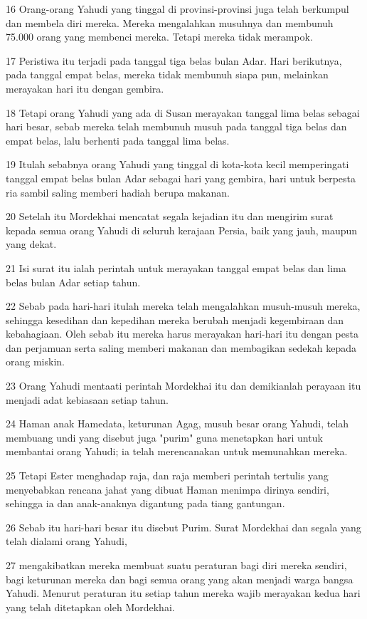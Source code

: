 \par 16 Orang-orang Yahudi yang tinggal di provinsi-provinsi juga telah berkumpul dan membela diri mereka. Mereka mengalahkan musuhnya dan membunuh 75.000 orang yang membenci mereka. Tetapi mereka tidak merampok.
\par 17 Peristiwa itu terjadi pada tanggal tiga belas bulan Adar. Hari berikutnya, pada tanggal empat belas, mereka tidak membunuh siapa pun, melainkan merayakan hari itu dengan gembira.
\par 18 Tetapi orang Yahudi yang ada di Susan merayakan tanggal lima belas sebagai hari besar, sebab mereka telah membunuh musuh pada tanggal tiga belas dan empat belas, lalu berhenti pada tanggal lima belas.
\par 19 Itulah sebabnya orang Yahudi yang tinggal di kota-kota kecil memperingati tanggal empat belas bulan Adar sebagai hari yang gembira, hari untuk berpesta ria sambil saling memberi hadiah berupa makanan.
\par 20 Setelah itu Mordekhai mencatat segala kejadian itu dan mengirim surat kepada semua orang Yahudi di seluruh kerajaan Persia, baik yang jauh, maupun yang dekat.
\par 21 Isi surat itu ialah perintah untuk merayakan tanggal empat belas dan lima belas bulan Adar setiap tahun.
\par 22 Sebab pada hari-hari itulah mereka telah mengalahkan musuh-musuh mereka, sehingga kesedihan dan kepedihan mereka berubah menjadi kegembiraan dan kebahagiaan. Oleh sebab itu mereka harus merayakan hari-hari itu dengan pesta dan perjamuan serta saling memberi makanan dan membagikan sedekah kepada orang miskin.
\par 23 Orang Yahudi mentaati perintah Mordekhai itu dan demikianlah perayaan itu menjadi adat kebiasaan setiap tahun.
\par 24 Haman anak Hamedata, keturunan Agag, musuh besar orang Yahudi, telah membuang undi yang disebut juga "purim" guna menetapkan hari untuk membantai orang Yahudi; ia telah merencanakan untuk memunahkan mereka.
\par 25 Tetapi Ester menghadap raja, dan raja memberi perintah tertulis yang menyebabkan rencana jahat yang dibuat Haman menimpa dirinya sendiri, sehingga ia dan anak-anaknya digantung pada tiang gantungan.
\par 26 Sebab itu hari-hari besar itu disebut Purim. Surat Mordekhai dan segala yang telah dialami orang Yahudi,
\par 27 mengakibatkan mereka membuat suatu peraturan bagi diri mereka sendiri, bagi keturunan mereka dan bagi semua orang yang akan menjadi warga bangsa Yahudi. Menurut peraturan itu setiap tahun mereka wajib merayakan kedua hari yang telah ditetapkan oleh Mordekhai.
